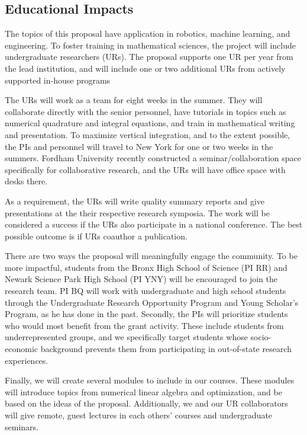\subsection{Educational Impacts}
\label{subsec:Educational_plans}
The topics of this proposal have application in robotics, machine
learning, and engineering. To foster training in mathematical sciences,
the project will include undergraduate researchers (URs). The proposal
supports one UR per year from the lead institution, and will include one
or two additional URs from actively supported in-house programs

The URs will work as a team for eight weeks in the summer. They will
collaborate directly with the senior personnel, have tutorials in topics
such as numerical quadrature and integral equations, and train in
mathematical writing and presentation. To maximize vertical integration,
and to the extent possible, the PIs and personnel will travel to New
York for one or two weeks in the summers. Fordham University recently
constructed a seminar/collaboration space specifically for collaborative
research, and the URs will have office space with desks there.

As a requirement, the URs will write quality summary reports and give
presentations at the their respective research symposia. The work will
be considered a success if the URs also participate in a national
conference. The best possible outcome is if URs coauthor a publication.

There are two ways the proposal will meaningfully engage the community.
To be more impactful, students from the Bronx High School of Science (PI
RR) and Newark Science Park High School (PI YNY) will be encouraged to
join the research team. PI BQ will work with undergraduate and high
school students through the Undergraduate Research Opportunity Program
and Young Scholar's Program, as he has done in the past. Secondly, the
PIs will prioritize students who would most benefit from the grant
activity. These include students from underrepresented groups,
and we specifically target students whose socio-economic
background prevents them from participating in out-of-state research
experiences. 

Finally, we will create several modules to include in our courses. These
modules will introduce topics from numerical linear algebra and
optimization, and be based on the ideas of the proposal. Additionally,
we and our UR collaborators will give remote, guest lectures in each
others' courses and undergraduate seminars. 

